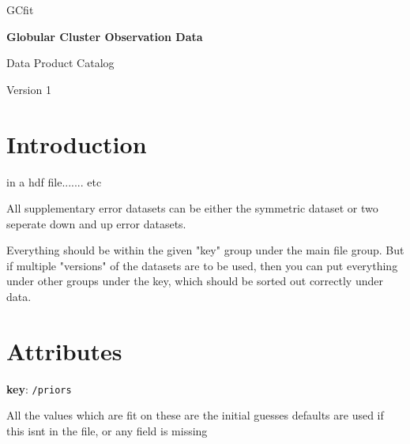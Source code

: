 \documentclass[12pt]{article}
\begin{document}
\begin{titlepage}
       \vspace*{2cm}

       \LARGE
        GCfit

       \vspace{2cm}

       \Huge
       \textbf{Globular Cluster Observation Data}

       \vspace{2cm}
        
        \LARGE
        Data Product Catalog
            
       \vspace{1.5cm}

       \vfill

       Version 1
\end{titlepage}

\section{Introduction}

in a hdf file....... etc

All supplementary error datasets can be either the symmetric dataset or two
seperate down and up error datasets.

Everything should be within the given "key" group under the main file group.
But if multiple "versions" of the datasets are to be used, then you can put
everything under other groups under the key, which should be sorted out
correctly under data.

\section{Attributes}

\textbf{key}: \texttt{/priors}

All the values which are fit on
these are the initial guesses
defaults are used if this isnt in the file, or any field is missing
\end{document}
